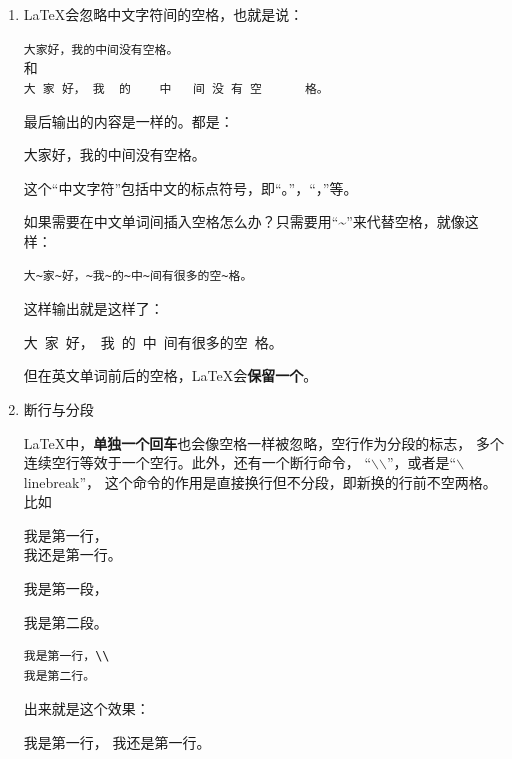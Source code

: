 \begin{enumerate}
\item{\LaTeX 会忽略中文字符间的空格，也就是说：}

{
\linespread{1}
\vspace{8pt}
\noindent\verb+大家好，我的中间没有空格。+\\
{和}\\
\verb+大 家 好， 我  的    中   间 没 有 空      格。+
\vspace{8pt}
}

最后输出的内容是一样的。都是：

大家好，我的中间没有空格。

这个“中文字符”包括中文的标点符号，即“。”，“，”等。

如果需要在中文单词间插入空格怎么办？只需要用“\~{}”来代替空格，就像这样：

{
\linespread{1}
\vspace{8pt}
\noindent\verb+大~家~好，~我~的~中~间有很多的空~格。+
\vspace{8pt}
}

这样输出就是这样了：

大~家~好，~我~的~中~间有很多的空~格。

但在英文单词前后的空格，\LaTeX 会{\bfseries 保留一个}。

\item{断行与分段}

\LaTeX 中，{\bfseries 单独一个回车}也会像空格一样被忽略，空行作为分段的标志，
多个连续空行等效于一个空行。此外，还有一个断行命令，
“$\backslash$$\backslash$”，或者是“$\backslash$linebreak”，
这个命令的作用是直接换行但不分段，即新换的行前不空两格。比如

{
\linespread{1}
\vspace{8pt}
我是第一行，\\
我还是第一行。

我是第一段，

我是第二段。

\begin{verbatim}
我是第一行，\\
我是第二行。
\end{verbatim}
\vspace{8pt}
}

出来就是这个效果：

\vspace{8pt}

\hspace{2em}我是第一行，
我还是第一行。


\end{enumerate}
